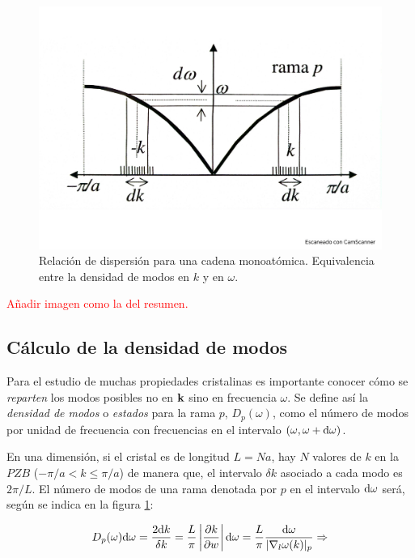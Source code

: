 \begin{figure}[h!] \centering
    \includegraphics[scale=0.36]{Cuerpo/Ch_05/Fotos libro 1.pdf}
    \caption{Relación de dispersión para una cadena monoatómica. Equivalencia entre la densidad de modos en $k$ y en $\omega$.}
    \label{Fig:05-01}
\end{figure}    
\begin{Anotacion}
\textcolor{red}{Añadir imagen como la del resumen.}
\end{Anotacion}


\subsection{Cálculo de la densidad de modos}

Para el estudio de muchas propiedades cristalinas es importante conocer cómo se \textit{reparten} los modos posibles no en $\mathbf{k}$ sino en frecuencia $\omega$. Se define así la \textit{densidad de modos} o \textit{estados} para la rama $p$, $D_p (\omega)$, como el número de modos por unidad de frecuencia con frecuencias en el intervalo $(\omega,\omega+\mathrm{d} \omega)$.

En una dimensión, si el cristal es de longitud $L=Na$, hay $N$ valores de $k$ en la $PZB$ ($-\pi/a < k\leq \pi/a$) de manera que, el intervalo $\delta k$ asociado a cada modo es $2 \pi / L$. El número de modos de una rama denotada por $p$ en el intervalo $\mathrm{d} \omega$ será, según se indica en la figura \ref{Fig:05-01}:

\begin{equation*}
	D_p (\omega) \mathrm{d} \omega = \frac{2 \mathrm{d} k}{\delta k} = \frac{L}{\pi} \left| \frac{\partial k}{\partial w}  \right| \mathrm{d} \omega = \frac{L}{\pi} \frac{\mathrm{d} \omega}{|\nabla_l \omega (k)|_p} \Rightarrow
\end{equation*} 

